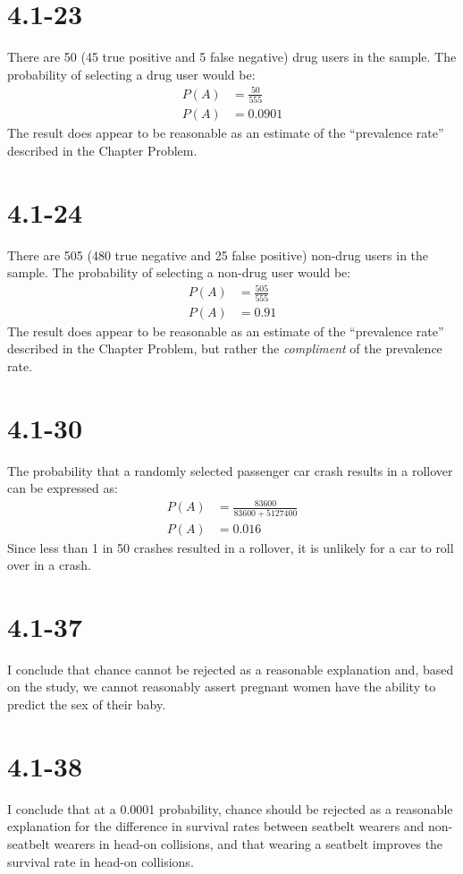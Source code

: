 \documentclass[12pt,fleqn]{article}
\newcommand{\chapter}{4.1}
\newcommand{\problem}[1]{\vspace{5ex}\section*{\chapter-#1}}
\begin{document}
\problem{23}
There are 50 (45 true positive and 5 false negative) drug users in the sample. The probability of selecting a drug user would be:
\begin{align*}
  P(A) &= \frac{50}{555} \\
  P(A) &= 0.0901
\end{align*}
The result does appear to be reasonable as an estimate of the ``prevalence rate'' described in the Chapter Problem.


\problem{24}
There are 505 (480 true negative and 25 false positive) non-drug users in the sample. The probability of selecting a non-drug user would be:
\begin{align*}
  P(A) &= \frac{505}{555} \\
  P(A) &= 0.91
\end{align*}
The result does appear to be reasonable as an estimate of the ``prevalence rate'' described in the Chapter Problem, but rather the \textit{compliment} of the prevalence rate.


\problem{30}
The probability that a randomly selected passenger car crash results in a rollover can be expressed as:
\begin{align*}
  P(A) &= \frac{83600}{83600 + 5127400} \\
  P(A) &= 0.016
\end{align*}
Since less than 1 in 50 crashes resulted in a rollover, it is unlikely for a car to roll over in a crash.


\problem{37}
I conclude that chance cannot be rejected as a reasonable explanation and, based on the study, we cannot reasonably assert pregnant women have the ability to predict the sex of their baby.


\problem{38}
I conclude that at a 0.0001 probability, chance should be rejected as a reasonable explanation for the difference in survival rates between seatbelt wearers and non-seatbelt wearers in head-on collisions, and that wearing a seatbelt improves the survival rate in head-on collisions.
\end{document}
